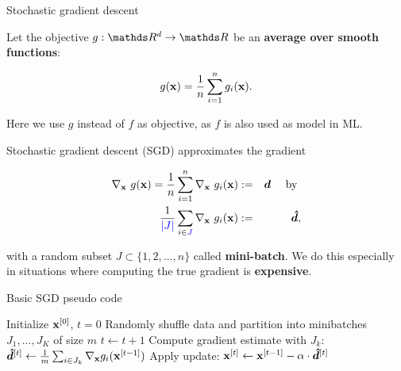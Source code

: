 \documentclass[11pt,compress,t,notes=noshow, xcolor=table]{beamer}
\begin{document}
\begin{vbframe}{Stochastic gradient descent}

Let the objective $g: \R^d \to \R$ be an \textbf{average over smooth functions}: 

$$
	g(\mathbf{x}) = \frac{1}{n}\sum\limits_{i=1}^n g_i(\mathbf{x}). 
$$

\begin{footnotesize}
	Here we use $g$ instead of $f$ as objective, as $f$ is also used as model in ML. 
\end{footnotesize}

\lz

Stochastic gradient descent (SGD) approximates the gradient 

\vspace*{-0.2cm}

\begin{eqnarray*}
	\nabla_{\mathbf{x}}~ g(\mathbf{x}) = \frac{1}{n}\sum\limits_{i=1}^n \nabla_{\mathbf{x}}~g_i(\mathbf{x}) &:=& \bm{d} \quad \text{ by }\\
	\frac{1}{\textcolor{blue}{|J|}}\sum_{i \in \textcolor{blue}{J}} \nabla_{\mathbf{x}}~g_i(\mathbf{x}) &:=& \bm{\hat d}, 
\end{eqnarray*}

with a random subset $J \subset \{1, 2, ..., n\}$ called \textbf{mini-batch}. We do this especially in situations where computing the true gradient is \textbf{expensive}. 

\framebreak 

	\begin{algorithm}[H]
		\footnotesize
		\caption{Basic SGD pseudo code}
		\begin{algorithmic}[1]
			\State Initialize $\mathbf{x}^{[0]}$, $t = 0$ 
			\State Randomly shuffle data and partition into minibatches $J_1, ..., J_K$ of size $m$
			\State $t \leftarrow t + 1$ 
			\State Compute gradient estimate with $J_k$: $\bm{\hat{d}}^{[t]} \leftarrow \frac{1}{m} \sum_{i \in J_k} \nabla_{\mathbf{x}} g_i(\mathbf{x}^{[t - 1]}) $
			\State Apply update: $\mathbf{x}^{[t]} \leftarrow \mathbf{x}^{[t-1]} - \alpha \cdot \bm{\hat{d}}^{[t]}$
			
			\EndFor		
			
			\EndWhile
		\end{algorithmic}
	\end{algorithm}

\vspace*{-0.5cm}


\end{vbframe}
\end{document}
